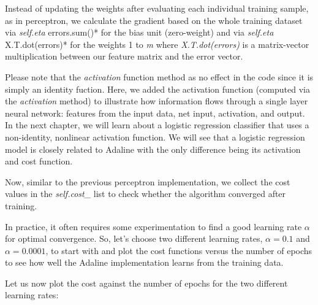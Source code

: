 \documentclass[11pt]{article}
\begin{document}
    Instead of updating the weights after evaluating each individual
training sample, as in perceptron, we calculate the gradient based on
the whole training dataset via \emph{self.eta } errors.sum()* for the
bias unit (zero-weight) and via \emph{self.eta } X.T.dot(errors)* for
the weights 1 to \emph{m} where \emph{X.T.dot(errors)} is a
matrix-vector multiplication between our feature matrix and the error
vector.

    Please note that the \emph{activation} function method as no effect in
the code since it is simply an identity fuction. Here, we added the
activation function (computed via the \emph{activation} method) to
illustrate how information flows through a single layer neural network:
features from the input data, net input, activation, and output. In the
next chapter, we will learn about a logistic regression classifier that
uses a non-identity, nonlinear activation function. We will see that a
logistic regression model is closely related to Adaline with the only
difference being its activation and cost function.

Now, similar to the previous perceptron implementation, we collect the
cost values in the \emph{self.cost\_} list to check whether the
algorithm converged after training.

    In practice, it often requires some experimentation to find a good
learning rate \(\alpha\) for optimal convergence. So, let's choose two
different learning rates, \(\alpha = 0.1\) and \(\alpha = 0.0001\), to
start with and plot the cost functions versus the number of epochs to
see how well the Adaline implementation learns from the training data.

    Let us now plot the cost against the number of epochs for the two
different learning rates:
\end{document}
